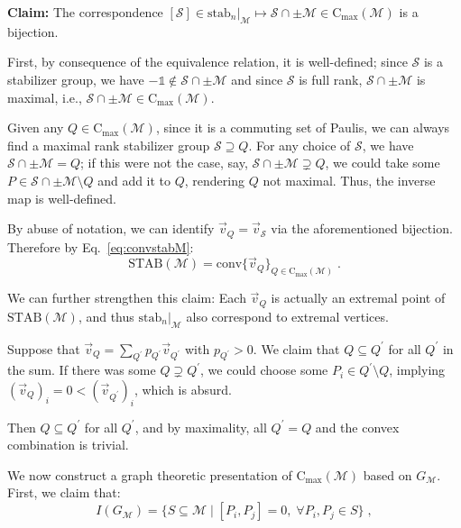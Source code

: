 \documentclass[10pt,aps,pra,twocolumn,floatfix,nofootinbib,superscriptaddress,longbibliography]{revtex4-2}
\newcommand{\1}{\mathbbm{1}}
\begin{document}
\textbf{Claim:} The correspondence $[\mathcal{S}]\in\mathrm{stab}_n|_\mathcal  M\mapsto \mathcal{S}\cap\pm\mathcal{M}\in\mathrm{C}_\mathrm{max}(\mathcal M)$ is a bijection. 

First, by consequence of the equivalence relation, it is well-defined; since $\mathcal{S}$ is a stabilizer group, we have $-\mathds{1}\notin\mathcal{S}\cap\pm\mathcal{M}$ and since $\mathcal{S}$ is full rank, $\mathcal{S}\cap\pm\mathcal{M}$ is maximal, i.e., $\mathcal{S}\cap\pm\mathcal{M}\in\mathrm{C}_\mathrm{max}(\mathcal M)$.

Given any $Q\in\mathrm{C}_\mathrm{max}(\mathcal M)$, since it is a commuting set of Paulis, we can always find a maximal rank stabilizer group $\mathcal{S}\supseteq Q$. For any choice of $\mathcal{S}$, we have $\mathcal{S}\cap\pm\mathcal{M}=Q$; if this were not the case, say, $\mathcal{S}\cap\pm\mathcal{M}\supsetneq Q$, we could take some $P\in \mathcal{S}\cap\pm\mathcal{M}\setminus Q$ and add it to $Q$, rendering $Q$ not maximal. Thus, the inverse map is well-defined.

By abuse of notation, we can identify $\vec{v}_Q=\vec{v}_\mathcal{S}$ via the aforementioned bijection. Therefore by Eq.~\eqref{eq:convstabM}:
\begin{equation}
    \mathrm{STAB}(\mathcal M) =\mathrm{conv}\{\vec{v}_Q\}_{Q \in \mathrm C_{\mathrm{max}}(\mathcal M)}\;.
    \label{eq:reducedstabcommuting}
\end{equation}

We can further strengthen this claim: Each $\vec{v}_Q$ is actually an extremal point of $\mathrm{STAB}(\mathcal M)$, and thus $\mathrm{stab}_n|_\mathcal M$ also correspond to extremal vertices.

Suppose that $\vec{v}_Q=\sum_{Q^\prime}p_{Q^\prime} \vec{v}_{Q^\prime}$ with $p_{Q^\prime}>0$. We claim that $Q\subseteq Q^\prime$ for all $Q^\prime$ in the sum. If there was some $Q\supsetneq Q^\prime$, we could choose some $P_i\in Q^\prime\setminus Q$, implying $(\vec{v}_Q)_i=0< (\vec{v}_{Q^\prime})_i$, which is absurd.

Then $Q\subseteq Q^\prime$ for all $Q^\prime$, and by maximality, all $Q^\prime =Q$ and the convex combination is trivial.

We now construct a graph theoretic presentation of $\mathrm{C}_\mathrm{max}(\mathcal M)$ based on $G_\mathcal M$. First, we claim that:
\begin{equation}
    I(G_\mathcal M)=\{ S \subseteq \mathcal M \;|\;[P_i,P_j]=0,\;\forall P_i, P_j \in S\}\;,
\end{equation}
\end{document}
